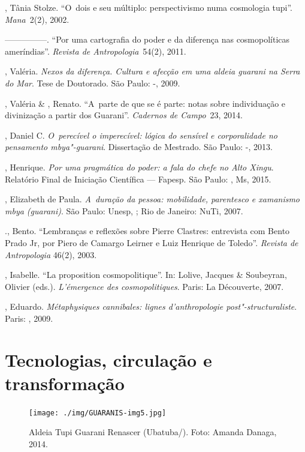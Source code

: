 \begin{Parskip}
, Tânia Stolze. ``O~dois e seu múltiplo: perspectivismo numa
cosmologia tupi''. \emph{Mana}~2(2), 2002.

—————. ``Por uma cartografia do poder e da diferença nas cosmopolíticas
ameríndias''. \emph{Revista de Antropologia}~54(2), 2011. 

, Valéria. \emph{Nexos da diferença. Cultura e afecção em uma aldeia
guarani na Serra do Mar}. Tese de Doutorado. São Paulo: -, 2009.

, Valéria \& , Renato. ``A~parte de que se é parte: notas
sobre individuação e divinização a partir dos Guarani''. \emph{Cadernos de
Campo}~23, 2014.

, Daniel C. \emph{O~perecível o imperecível: lógica do sensível e
corporalidade no pensamento mbya"-guarani}. Dissertação de Mestrado. São
Paulo: -, 2013.

, Henrique. \emph{Por uma pragmática do poder: a fala do chefe no Alto
Xingu}. Relatório Final de Iniciação Científica --- Fapesp. São Paulo:
, Ms, 2015. 

, Elizabeth de Paula. \emph{A~duração da pessoa: mobilidade,
parentesco e xamanismo mbya (guarani)}. São Paulo: Unesp, ; Rio de
Janeiro: NuTi, 2007.

 ., Bento. ``Lembranças e reflexões sobre Pierre Clastres:
entrevista com Bento Prado Jr, por Piero de Camargo Leirner e Luiz
Henrique de Toledo''. \emph{Revista de Antropologia} 46(2), 2003.

, Isabelle. ``La proposition cosmopolitique''. In: Lolive, Jacques
\& Soubeyran, Olivier (eds.). \emph{L’émergence des cosmopolitiques}. Paris:
La Découverte, 2007.

  , Eduardo. \emph{Métaphysiques cannibales: lignes
d’anthropologie post"-structuraliste}. Paris: , 2009.
\end{Parskip}

\makeatletter\@openrightfalse
\movetooddpage
\part{Tecnologias, circulação e transformação}

\begin{vplace}
\begin{figure}[H]
  \centering
 \texttt{[image: ./img/GUARANIS-img5.jpg]}	
  \hfill
  \caption{Aldeia Tupi Guarani Renascer (Ubatuba/). Foto: Amanda Danaga, 2014.}
\end{figure}
\end{vplace}


